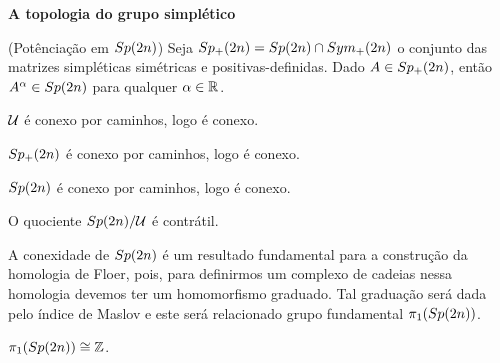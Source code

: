 \documentclass{beamer}
\newcommand{\titulo}[1]{\centering \textbf{#1}}
\begin{document}
\begin{frame}
	\titulo{A topologia do grupo simplético}
	\begin{proposicao}
		(Potênciação em $Sp(2n)$) Seja $Sp_{+}(2n) = Sp(2n) \cap Sym_{+}(2n)$ o conjunto das matrizes simpléticas simétricas e positivas-definidas. Dado $A \in Sp_{+}(2n)$, então $A^{\alpha} \in Sp(2n)$ para qualquer $\alpha \in \mathbb{R}^{}$.
	\end{proposicao}
	
	\begin{lema}
		$\mathcal{U}$ é conexo por caminhos, logo é conexo.
	\end{lema}
	
	\begin{lema}
		$Sp_{+}(2n)$ é conexo por caminhos, logo é conexo.
	\end{lema}
	
	\begin{teorema}
		$Sp(2n)$ é conexo por caminhos, logo é conexo.
	\end{teorema}
	
	\begin{teorema}
		O quociente $Sp(2n)/\mathcal{U}$ é contrátil.
	\end{teorema}
	
\end{frame}

\begin{frame}
	A conexidade de $Sp(2n)$ é um resultado fundamental para a construção da homologia de Floer, pois, para definirmos um complexo de cadeias nessa homologia devemos ter um homomorfismo graduado. Tal graduação será dada pelo índice de Maslov e este será relacionado grupo fundamental $\pi_{1}(Sp(2n))$.
	
	\begin{teorema}
		$\pi_{1}(Sp(2n)) \cong \mathbb{Z}$.
	\end{teorema}
\end{frame}
\end{document}
